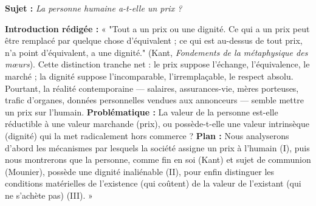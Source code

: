 \documentclass[11pt]{article}
\begin{document}
\begin{exoresolu}
\textbf{Sujet :} \emph{La personne humaine a-t-elle un prix ?}

\textbf{Introduction rédigée :}
« "Tout a un prix ou une dignité. Ce qui a un prix peut être remplacé par quelque chose d'équivalent ; ce qui est au-dessus de tout prix, n'a point d'équivalent, a une dignité." (Kant, \emph{Fondements de la métaphysique des mœurs}). Cette distinction tranche net : le prix suppose l'échange, l'équivalence, le marché ; la dignité suppose l'incomparable, l'irremplaçable, le respect absolu. Pourtant, la réalité contemporaine — salaires, assurances-vie, mères porteuses, trafic d'organes, données personnelles vendues aux annonceurs — semble mettre un prix sur l'humain. \textbf{Problématique :} La valeur de la personne est-elle réductible à une valeur marchande (prix), ou possède-t-elle une valeur intrinsèque (dignité) qui la met radicalement hors commerce ? \textbf{Plan :} Nous analyserons d'abord les mécanismes par lesquels la société assigne un prix à l'humain (I), puis nous montrerons que la personne, comme fin en soi (Kant) et sujet de communion (Mounier), possède une dignité inaliénable (II), pour enfin distinguer les conditions matérielles de l'existence (qui coûtent) de la valeur de l'existant (qui ne s'achète pas) (III). »


\end{exoresolu}
\end{document}
